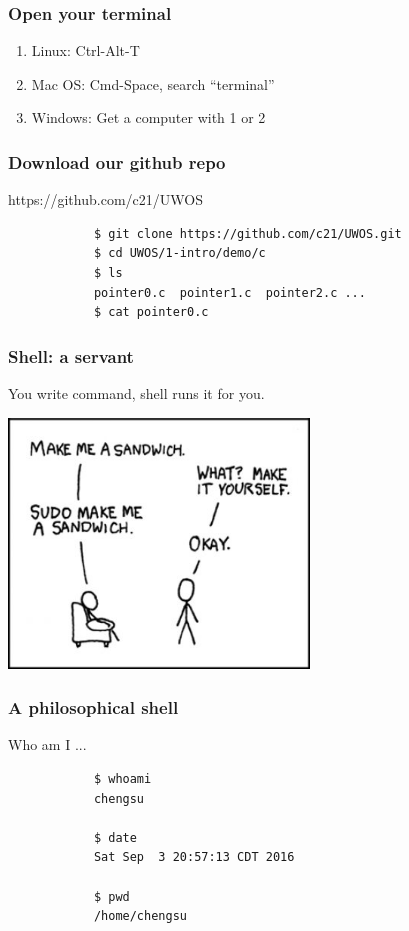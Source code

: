 \documentclass{beamer}
\begin{document}
  \begin{frame}
    \frametitle{Open your terminal}
    \begin{enumerate}
      \item Linux: Ctrl-Alt-T
      \item Mac OS: Cmd-Space, search ``terminal''
      \item Windows: Get a computer with 1 or 2
    \end{enumerate}
  \end{frame}

	\begin{frame}[fragile]
		\frametitle{Download our github repo}
		https://github.com/c21/UWOS
		\begin{center}		
		\begin{verbatim}
			$ git clone https://github.com/c21/UWOS.git
			$ cd UWOS/1-intro/demo/c
			$ ls
			pointer0.c  pointer1.c  pointer2.c ...
			$ cat pointer0.c
    \end{verbatim}
		\end{center}
	\end{frame}

	\begin{frame}
		\frametitle{Shell: a servant}
		You write command, shell runs it for you.
		\begin{center}
		\includegraphics[width=0.6\textwidth, height=0.6\textheight]{img/sudo.jpg}
		\end{center}
	\end{frame}

	\begin{frame}[fragile]
		\frametitle{A philosophical shell}
		Who am I ...
		\begin{center}
		\begin{verbatim}
			$ whoami
			chengsu

			$ date
			Sat Sep  3 20:57:13 CDT 2016

			$ pwd
			/home/chengsu 
		\end{verbatim}
		\end{center}	
	\end{frame}
\end{document}
